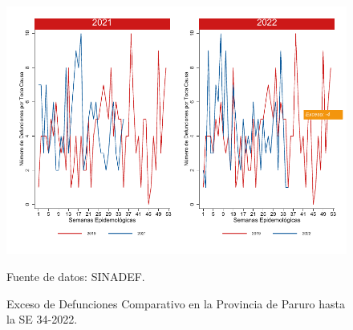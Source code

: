 \documentclass[12pt,a4paper,openany]{book}
\begin{document}
	\begin{figure}[h]
		\caption{Exceso de Defunciones Comparativo en la Provincia de Paruro hasta la SE 34-2022.}\label{fig:exceso_paruro}
		\begin{center}
			\includegraphics[width=0.7\linewidth]{../figuras/exceso_10.pdf}
		\end{center}
		{\footnotesize {Fuente de datos: SINADEF.}}
	\end{figure}
	
	
	\clearpage
	
\end{document}
